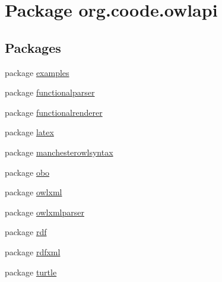 \hypertarget{namespaceorg_1_1coode_1_1owlapi}{\section{Package org.\-coode.\-owlapi}
\label{namespaceorg_1_1coode_1_1owlapi}
}
\subsection*{Packages}
\begin{DoxyCompactItemize}
\item 
package \hyperlink{namespaceorg_1_1coode_1_1owlapi_1_1examples}{examples}
\item 
package \hyperlink{namespaceorg_1_1coode_1_1owlapi_1_1functionalparser}{functionalparser}
\item 
package \hyperlink{namespaceorg_1_1coode_1_1owlapi_1_1functionalrenderer}{functionalrenderer}
\item 
package \hyperlink{namespaceorg_1_1coode_1_1owlapi_1_1latex}{latex}
\item 
package \hyperlink{namespaceorg_1_1coode_1_1owlapi_1_1manchesterowlsyntax}{manchesterowlsyntax}
\item 
package \hyperlink{namespaceorg_1_1coode_1_1owlapi_1_1obo}{obo}
\item 
package \hyperlink{namespaceorg_1_1coode_1_1owlapi_1_1owlxml}{owlxml}
\item 
package \hyperlink{namespaceorg_1_1coode_1_1owlapi_1_1owlxmlparser}{owlxmlparser}
\item 
package \hyperlink{namespaceorg_1_1coode_1_1owlapi_1_1rdf}{rdf}
\item 
package \hyperlink{namespaceorg_1_1coode_1_1owlapi_1_1rdfxml}{rdfxml}
\item 
package \hyperlink{namespaceorg_1_1coode_1_1owlapi_1_1turtle}{turtle}
\end{DoxyCompactItemize}
